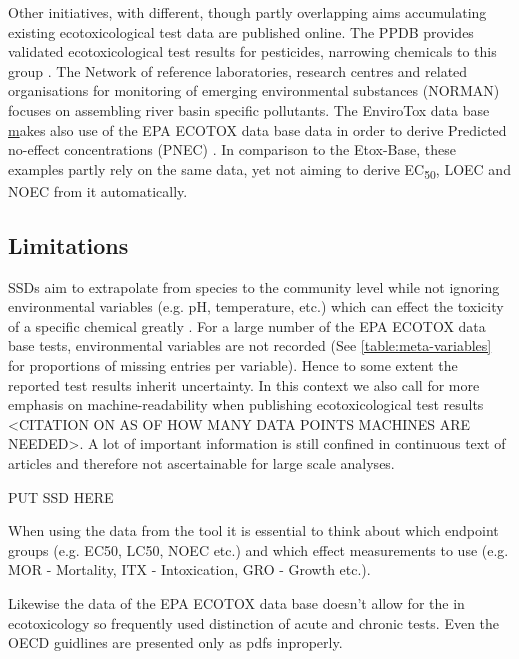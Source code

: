 \documentclass[english]{article}
\newcommand{\etoxbase}{Etox-Base}
\newcommand{\epa}{EPA ECOTOX data base}
\newcommand{\ecfifty}{EC\textsubscript{50}}
\begin{document}
Other initiatives, with different, though partly overlapping aims accumulating existing ecotoxicological test data are published online. The PPDB provides validated ecotoxicological test results for pesticides, narrowing chemicals to this group \citep{lewis_international_2016}. The Network of reference laboratories, research centres and related organisations for monitoring of emerging environmental substances (NORMAN) focuses on assembling river basin specific pollutants\citep{von_der_ohe_new_2011}. The EnviroTox data base \href{https://envirotoxdatabase.org/} makes also use of the \epa{} data in order to derive Predicted no-effect concentrations (PNEC) \citep{health_and_environmental_sciences_institute_hesi_envirotox_2019}. In comparison to the \etoxbase, these examples partly rely on the same data, yet not aiming to derive \ecfifty, LOEC and NOEC from it automatically.






\subsection*{Limitations}

SSDs aim to extrapolate from species to the community level while not ignoring environmental variables (e.g. pH, temperature, etc.) which can effect the toxicity of a specific chemical greatly \citep{posthuma_species_2002}. For a large number of the \epa{} tests, environmental variables are not recorded (See \ref{table:meta-variables} for proportions of missing entries per variable). Hence to some extent the reported test results inherit uncertainty. In this context we also call for more emphasis on machine-readability when publishing ecotoxicological test results <CITATION ON AS OF HOW MANY DATA POINTS MACHINES ARE NEEDED>. A lot of important information is still confined in continuous text of articles and therefore not ascertainable for large scale analyses.








PUT SSD HERE


When using the data from the tool it is essential to think about which endpoint groups (e.g. EC50, LC50, NOEC etc.) and which effect measurements to use (e.g. MOR - Mortality, ITX - Intoxication, GRO - Growth etc.).

Likewise the data of the \epa{} doesn't allow for the in ecotoxicology so frequently used distinction of acute and chronic tests. Even the OECD guidlines are presented only as pdfs inproperly.
\end{document}
